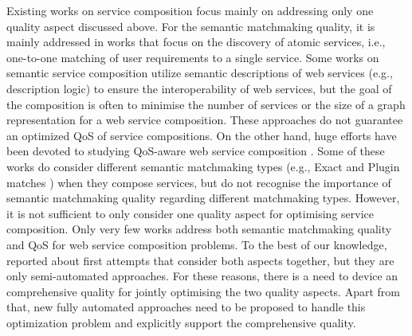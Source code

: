 Existing works on service composition focus mainly on addressing only one quality aspect discussed above. For the semantic matchmaking quality, it is mainly addressed in works that focus on the discovery of atomic services, i.e., one-to-one matching of user requirements to a single service. Some works \cite{bansal2016generalized,boustil2014semantic,mier2015integrated} on semantic service composition utilize semantic descriptions of web services (e.g., description logic) to ensure the interoperability of web services, but the goal of the composition is often to minimise the number of services or the size of a graph representation for a web service composition. These approaches do not guarantee an optimized QoS of service compositions. On the other hand, huge efforts have been devoted to studying QoS-aware web service composition \cite{da2015graphevol,da2016particle,gupta2015optimization,ma2015hybrid,qi2010combining,yu2013adaptive}. Some of these works do consider different semantic matchmaking types (e.g., Exact and Plugin matches \cite{paolucci2002semantic}) when they compose services, but do not recognise the importance of semantic matchmaking quality regarding different matchmaking types. However, it is not sufficient to only consider one quality aspect for optimising service composition. Only very few works address both semantic matchmaking quality and QoS for web service composition problems. To the best of our knowledge, \cite{fanjiang2014semantic,lecue2009optimizing,pop2009immune} reported about first attempts that consider both aspects together, but they are only semi-automated approaches. For these reasons, there is a need to device an comprehensive quality for jointly optimising the two quality aspects. Apart from that, new fully automated approaches need to be proposed to handle this optimization problem and explicitly support the comprehensive quality. 


